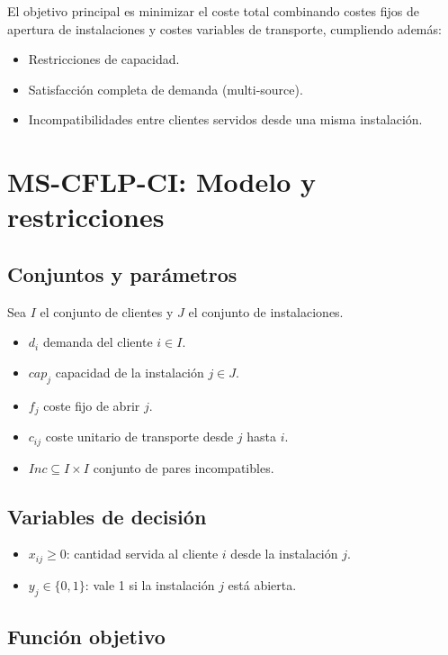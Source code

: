 \documentclass[12pt, a4paper]{report}
\begin{document}
El objetivo principal es minimizar el coste total combinando costes fijos de apertura de instalaciones y costes variables de transporte, cumpliendo además:

\begin{itemize}
  \item Restricciones de capacidad.
  \item Satisfacción completa de demanda (multi-source).
  \item Incompatibilidades entre clientes servidos desde una misma instalación.
\end{itemize}


\chapter{MS-CFLP-CI: Modelo y restricciones}

\section{Conjuntos y parámetros}

Sea $I$ el conjunto de clientes y $J$ el conjunto de instalaciones.

\begin{itemize}
  \item $d_i$ demanda del cliente $i\in I$.
  \item $cap_j$ capacidad de la instalación $j\in J$.
  \item $f_j$ coste fijo de abrir $j$.
  \item $c_{ij}$ coste unitario de transporte desde $j$ hasta $i$.
  \item $Inc\subseteq I\times I$ conjunto de pares incompatibles.
\end{itemize}

\section{Variables de decisión}

\begin{itemize}
  \item $x_{ij}\ge 0$: cantidad servida al cliente $i$ desde la instalación $j$.
  \item $y_j\in\{0,1\}$: vale 1 si la instalación $j$ está abierta.
\end{itemize}

\section{Función objetivo}
\end{document}
